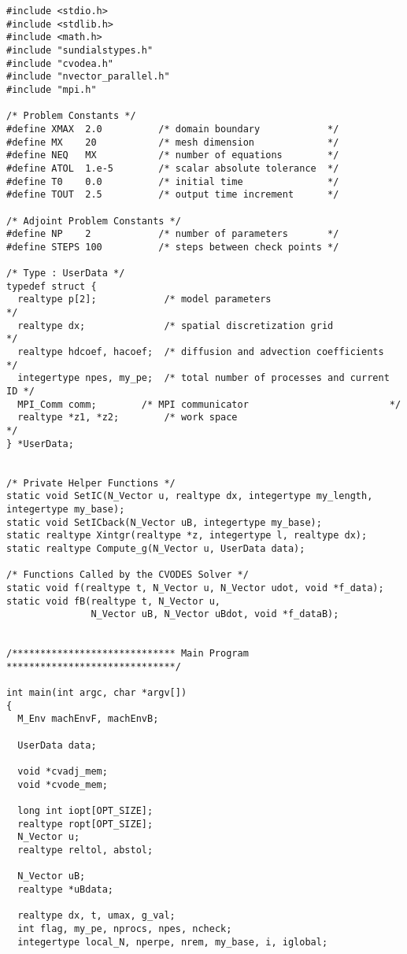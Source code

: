 \begin{verbatim}
#include <stdio.h>
#include <stdlib.h>
#include <math.h>
#include "sundialstypes.h"
#include "cvodea.h"
#include "nvector_parallel.h"
#include "mpi.h"

/* Problem Constants */
#define XMAX  2.0          /* domain boundary            */
#define MX    20           /* mesh dimension             */
#define NEQ   MX           /* number of equations        */
#define ATOL  1.e-5        /* scalar absolute tolerance  */
#define T0    0.0          /* initial time               */
#define TOUT  2.5          /* output time increment      */

/* Adjoint Problem Constants */
#define NP    2            /* number of parameters       */
#define STEPS 100          /* steps between check points */

/* Type : UserData */
typedef struct {
  realtype p[2];            /* model parameters                         */
  realtype dx;              /* spatial discretization grid              */
  realtype hdcoef, hacoef;  /* diffusion and advection coefficients     */
  integertype npes, my_pe;  /* total number of processes and current ID */
  MPI_Comm comm;        /* MPI communicator                         */
  realtype *z1, *z2;        /* work space                               */
} *UserData;


/* Private Helper Functions */
static void SetIC(N_Vector u, realtype dx, integertype my_length, integertype my_base);
static void SetICback(N_Vector uB, integertype my_base);
static realtype Xintgr(realtype *z, integertype l, realtype dx);
static realtype Compute_g(N_Vector u, UserData data);

/* Functions Called by the CVODES Solver */
static void f(realtype t, N_Vector u, N_Vector udot, void *f_data);
static void fB(realtype t, N_Vector u, 
               N_Vector uB, N_Vector uBdot, void *f_dataB);


/***************************** Main Program ******************************/

int main(int argc, char *argv[])
{
  M_Env machEnvF, machEnvB;

  UserData data;

  void *cvadj_mem;
  void *cvode_mem;
  
  long int iopt[OPT_SIZE];
  realtype ropt[OPT_SIZE];
  N_Vector u;
  realtype reltol, abstol;

  N_Vector uB;
  realtype *uBdata;

  realtype dx, t, umax, g_val;
  int flag, my_pe, nprocs, npes, ncheck;
  integertype local_N, nperpe, nrem, my_base, i, iglobal;


\end{verbatim}
